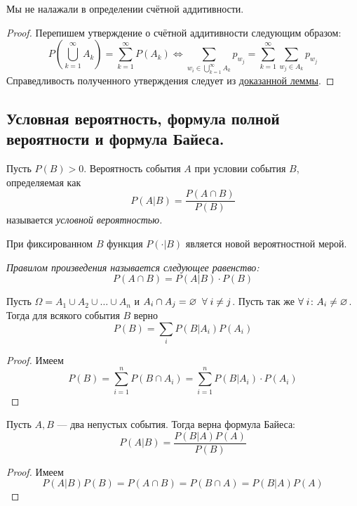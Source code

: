 \begin{proposal}
    Мы не налажали в определении счётной аддитивности.
\end{proposal}
\begin{proof}
    Перепишем утверждение о счётной аддитивности следующим образом:
    \[
        P\left( \bigcup\limits_{k = 1}^{\infty}A_k \right) = \sum\limits_{k = 1}^{\infty} P(A_k)
        \iff
        \sum\limits_{w_i \in \bigcup\limits_{k = 1}^{\infty}A_k} p_{w_j} =
        \sum\limits_{k = 1}^{\infty}\sum\limits_{w_j \in A_k} p_{w_j}
    \]
    Справедливость полученного утверждения следует из \hyperref[lemma_1.1]{доказанной леммы}.
\end{proof}
\subsection{Условная вероятность, формула полной вероятности
и формула Байеса.}
\begin{definition}
    Пусть $P(B) > 0$. Вероятность события $A$ при условии события $B$, определяемая как
    \[
        P(A | B) = \frac{P(A \cap B)}{P(B)}
    \]
    называется \it{условной вероятностью}.

    При фиксированном $B$ функция $P(\cdot | B)$ является новой вероятностной мерой.
\end{definition}
\begin{definition}
    \it{Правилом произведения} называется следующее равенство:
    \[
        P(A \cap B) = P(A | B) \cdot P(B)
    \]
\end{definition}
\begin{theorem}
    Пусть $\Omega = A_1 \cup A_2 \cup \ldots \cup A_n$ и $A_i \cap A_j = \varnothing\;\; \forall\;
    i \neq j$. Пусть так же $\forall\; i\colon A_i \neq \varnothing$. Тогда для всякого события $B$
    верно
    \[
        P(B) = \sum\limits_{i} P(B|A_i)P(A_i)
    \]
\end{theorem}
\begin{proof}
    Имеем
    \[
        P(B) = \sum\limits_{i = 1}^{n} P(B \cap A_i) =
        \sum\limits_{i = 1}^{n} P(B|A_i) \cdot P(A_i)
    \]
\end{proof}
\begin{theorem}
    Пусть $A, B$ --- два непустых события. Тогда верна формула Байеса:
    \[
        P(A|B) = \frac{P(B|A)P(A)}{P(B)}
    \]
\end{theorem}
\begin{proof}
    Имеем
    \[
        P(A|B)P(B) = P(A \cap B) = P(B \cap A) = P(B|A)P(A)
    \]
\end{proof}

